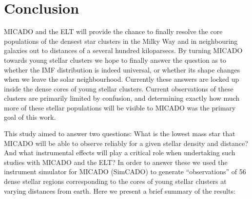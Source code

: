 \section{Conclusion}
\label{sec:conclusion}

MICADO and the ELT will provide the chance to finally resolve the core populations of the densest star clusters in the Milky Way and in neighbouring galaxies out to distances of a several hundred kiloparsecs. By turning MICADO towards young stellar clusters we hope to finally answer the question as to whether the IMF distribution is indeed universal, or whether its shape changes when we leave the solar neighbourhood. Currently these answers are locked up inside the dense cores of young stellar clusters. Current observations of these clusters are primarily limited by confusion, and determining exactly how much more of these stellar populations will be visible to MICADO was the primary goal of this work.

This study aimed to answer two questions: What is the lowest mass star that MICADO will be able to observe reliably for a given stellar density and distance? And what instrumental effects will play a critical role when undertaking such studies with MICADO and the ELT? In order to answer these we used the instrument simulator for MICADO (SimCADO) to generate ``observations'' of 56 dense stellar regions corresponding to the cores of young stellar clusters at varying distances from earth. Here we present a brief summary of the results:

